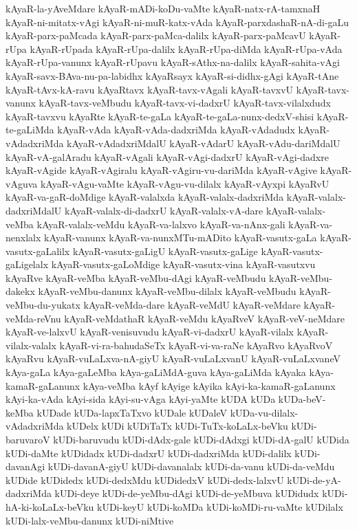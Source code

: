 {kAyaR-la-yAveMdare
kAyaR-mADi-koDu-vaMte
kAyaR-natx-rA-tamxnaH
kAyaR-ni-mitatx-vAgi
kAyaR-ni-muR-katx-vAda
kAyaR-parxdashaR-nA-di-gaLu
kAyaR-parx-paMcada
kAyaR-parx-paMca-dalilx
kAyaR-parx-paMcavU
kAyaR-rUpa
kAyaR-rUpada
kAyaR-rUpa-dalilx
kAyaR-rUpa-diMda
kAyaR-rUpa-vAda
kAyaR-rUpa-vanunx
kAyaR-rUpavu
kAyaR-sAthx-na-dalilx
kAyaR-sahita-vAgi
kAyaR-savx-BAva-nu-pa-labidhx
kAyaRsayx
kAyaR-si-didhx-gAgi
kAyaR-tAne
kAyaR-tAvx-kA-ravu
kAyaRtavx
kAyaR-tavx-vAgali
kAyaR-tavxvU
kAyaR-tavx-vanunx
kAyaR-tavx-veMbudu
kAyaR-tavx-vi-dadxrU
kAyaR-tavx-vilalxdudx
kAyaR-tavxvu
kAyaRte
kAyaR-te-gaLa
kAyaR-te-gaLa-nunx-dedxV-shisi
kAyaR-te-gaLiMda
kAyaR-vAda
kAyaR-vAda-dadxriMda
kAyaR-vAdadudx
kAyaR-vAdadxriMda
kAyaR-vAdadxriMdalU
kAyaR-vAdarU
kAyaR-vAdu-dariMdalU
kAyaR-vA-galAradu
kAyaR-vAgali
kAyaR-vAgi-dadxrU
kAyaR-vAgi-dadxre
kAyaR-vAgide
kAyaR-vAgiralu
kAyaR-vAgiru-vu-dariMda
kAyaR-vAgive
kAyaR-vAguva
kAyaR-vAgu-vaMte
kAyaR-vAgu-vu-dilalx
kAyaR-vAyxpi
kAyaRvU
kAyaR-va-gaR-doMdige
kAyaR-valalxda
kAyaR-valalx-dadxriMda
kAyaR-valalx-dadxriMdalU
kAyaR-valalx-di-dadxrU
kAyaR-valalx-vA-dare
kAyaR-valalx-veMba
kAyaR-valalx-veMdu
kAyaR-va-lalxvo
kAyaR-va-nAnx-gali
kAyaR-va-nenxlalx
kAyaR-vanunx
kAyaR-va-nunxMTu-mADito
kAyaR-vasutx-gaLa
kAyaR-vasutx-gaLalilx
kAyaR-vasutx-gaLigU
kAyaR-vasutx-gaLige
kAyaR-vasutx-gaLigelalx
kAyaR-vasutx-gaLoMdige
kAyaR-vasutx-vina
kAyaR-vasutxvu
kAyaRve
kAyaR-veMba
kAyaR-veMbu-dAgi
kAyaR-veMbudu
kAyaR-veMbu-dakekx
kAyaR-veMbu-danunx
kAyaR-veMbu-dilalx
kAyaR-veMbudu
kAyaR-veMbu-du-yukatx
kAyaR-veMda-dare
kAyaR-veMdU
kAyaR-veMdare
kAyaR-veMda-reVnu
kAyaR-veMdathaR
kAyaR-veMdu
kAyaRveV
kAyaR-veV-neMdare
kAyaR-ve-lalxvU
kAyaR-venisuvudu
kAyaR-vi-dadxrU
kAyaR-vilalx
kAyaR-vilalx-valalx
kAyaR-vi-ra-bahudaSeTx
kAyaR-vi-va-raNe
kAyaRvo
kAyaRvoV
kAyaRvu
kAyaR-vuLaLxva-nA-giyU
kAyaR-vuLaLxvanU
kAyaR-vuLaLxvaneV
kAya-gaLa
kAya-gaLeMba
kAya-gaLiMdA-guva
kAya-gaLiMda
kAyaka
kAya-kamaR-gaLanunx
kAya-veMba
kAyf
kAyige
kAyika
kAyi-ka-kamaR-gaLanunx
kAyi-ka-vAda
kAyi-sida
kAyi-su-vAga
kAyi-yaMte
kUDA
kUDa
kUDa-beV-keMba
kUDade
kUDa-lapxTaTxvo
kUDale
kUDaleV
kUDa-vu-dilalx-vAdadxriMda
kUDelx
kUDi
kUDiTaTx
kUDi-TuTx-koLaLx-beVku
kUDi-baruvaroV
kUDi-baruvudu
kUDi-dAdx-gale
kUDi-dAdxgi
kUDi-dA-galU
kUDida
kUDi-daMte
kUDidadx
kUDi-dadxrU
kUDi-dadxriMda
kUDi-dalilx
kUDi-davanAgi
kUDi-davanA-giyU
kUDi-davanalalx
kUDi-da-vanu
kUDi-da-veMdu
kUDide
kUDidedx
kUDi-dedxMdu
kUDidedxV
kUDi-dedx-lalxvU
kUDi-de-yA-dadxriMda
kUDi-deye
kUDi-de-yeMbu-dAgi
kUDi-de-yeMbuva
kUDidudx
kUDi-hA-ki-koLaLx-beVku
kUDi-keyU
kUDi-koMDa
kUDi-koMDi-ru-vaMte
kUDilalx
kUDi-lalx-veMbu-danunx
kUDi-niMtive
}
